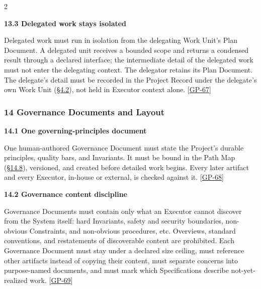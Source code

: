 \begin{multicols}{2}
\hypertarget{nss-13.3}{}

\par\smallskip\noindent\textbf{13.3 Delegated work stays isolated}\par\nopagebreak

Delegated work must run in isolation from the delegating Work Unit's Plan Document. A delegated unit receives a bounded scope and returns a condensed result through a declared interface; the intermediate detail of the delegated work must not enter the delegating context. The delegator retains its Plan Document. The delegate's detail must be recorded in the Project Record under the delegate's own Work Unit (\hyperlink{nss-4.2}{\S4.2}), not held in Executor context alone. [\hyperlink{gp-67}{GP-67}]

\hypertarget{nss-14}{}

\subsubsection*{14 Governance Documents and Layout}

\hypertarget{nss-14.1}{}

\par\smallskip\noindent\textbf{14.1 One governing-principles document}\par\nopagebreak

One human-authored Governance Document must state the Project's durable principles, quality bars, and Invariants. It must be bound in the Path Map (\hyperlink{nss-14.8}{\S14.8}), versioned, and created before detailed work begins. Every later artifact and every Executor, in-house or external, is checked against it. [\hyperlink{gp-68}{GP-68}]

\hypertarget{nss-14.2}{}

\par\smallskip\noindent\textbf{14.2 Governance content discipline}\par\nopagebreak

Governance Documents must contain only what an Executor cannot discover from the System itself: hard Invariants, safety and security boundaries, non-obvious Constraints, and non-obvious procedures, etc. Overviews, standard conventions, and restatements of discoverable content are prohibited. Each Governance Document must stay under a declared size ceiling, must reference other artifacts instead of copying their content, must separate concerns into purpose-named documents, and must mark which Specifications describe not-yet-realized work. [\hyperlink{gp-69}{GP-69}]


\end{multicols}
